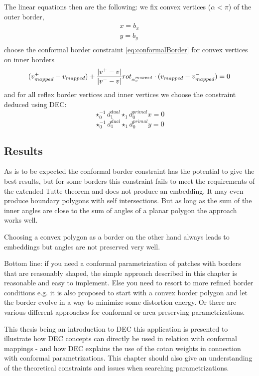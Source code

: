 The linear equations then are the following: we fix convex vertices ($\alpha < \pi$) of the outer border,
\begin{eqnarray*}
 &x = b_x & \\
 &y = b_y &\\
\end{eqnarray*}
choose the conformal border constraint \ref{eq:conformalBorder} for convex vertices on inner borders 
\[(v^+_{mapped}-v_{mapped} ) + \frac{\left| v^+-v \right|}{\left| v^- -v \right|}rot_{\alpha_v^{mapped}} \cdot (v_{mapped} - v_{mapped}^- )= 0 \]
and for all reflex border vertices and inner vertices we choose the constraint deduced using DEC:
\[\star_0^{-1} d_1^{dual} \star_1 d_0^{primal} x = 0\]
\[\star_0^{-1} d_1^{dual} \star_1 d_0^{primal} y = 0\]


\subsection{Results}

As is to be expected the conformal border constraint has the potential to give the best results, but for some borders this constraint fails to meet the requirements of the extended Tutte theorem and does not produce an embedding. It may even produce boundary polygons with self intersections. But as long as the sum of the inner angles are close to the sum of angles of a planar polygon the approach works well. 

Choosing a convex polygon as a border on the other hand always leads to embeddings but angles are not preserved very well. 

Bottom line: if you need a conformal parametrization of patches with borders that are reasonably shaped, the simple approach described in this chapter is reasonable and easy to implement. Else you need to resort to more refined border conditions e.g.  it is also proposed to start with a convex border polygon and let the border evolve in a way to minimize some distortion energy. Or there are various different approaches for conformal or area preserving parametrizations.  

This thesis being an introduction to DEC this application is presented to illustrate how DEC concepts can directly be used in relation with conformal mappings - and how DEC explains the use of the cotan weights in connection with conformal parametrizations. This chapter should also give an understanding of the theoretical constraints and issues when searching parametrizations.


